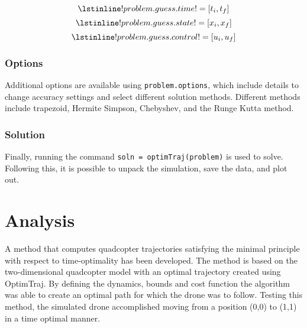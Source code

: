 \documentclass[12pt]{article}
\begin{document}
	\begin{figure}[H]
		\begin{equation*}
			\lstinline!problem.guess.time! = [t_{i}, t_{f}]
		\end{equation*}
		\begin{equation*}
			\lstinline!problem.guess.state! = [x_{i}, x_{f}]
		\end{equation*}
		\begin{equation*}
			\lstinline!problem.guess.control! = [u_{i}, u_{f}] 
		\end{equation*}
	\end{figure}
	\subsubsection{Options}
	Additional options are available using \lstinline!problem.options!, which include details to change accuracy settings and select different solution methods. Different methods include trapezoid, Hermite Simpson, Chebyshev, and the Runge Kutta method.
	\subsubsection{Solution}
	Finally, running the command \lstinline!soln = optimTraj(problem)! is used to solve. Following this, it is possible to unpack the simulation, save the data, and plot out.
	\section{Analysis}
	A method that computes quadcopter trajectories satisfying the minimal principle with respect to time-optimality has been developed. The method is based on the two-dimensional quadcopter model with an optimal trajectory created using OptimTraj. By defining the dynamics, bounds and cost function the algorithm was able to create an optimal path for which the drone was to follow. Testing this method, the simulated drone accomplished moving from a position (0,0) to (1,1) in a time optimal manner.
\end{document}
